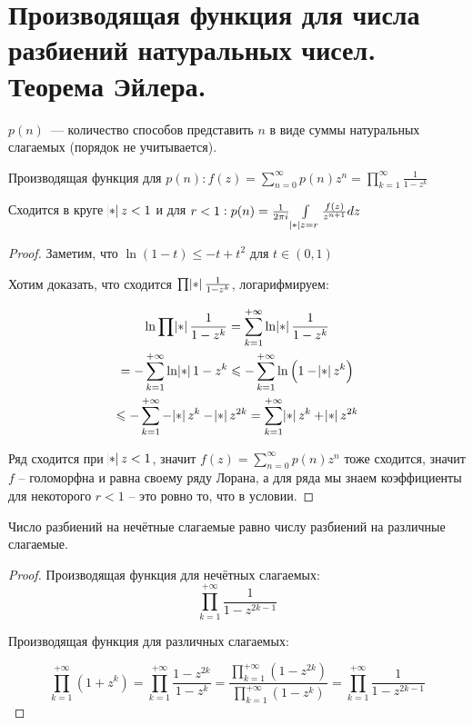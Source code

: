 \section{Производящая функция для числа разбиений натуральных чисел. Теорема Эйлера.}

\begin{definition}
    $p(n)$~--- количество способов представить
    $n$ в виде суммы натуральных слагаемых (порядок не учитывается). 
\end{definition}

\begin{theorem}
    Производящая функция для $p(n): f(z) = \sum\limits_{n=0}^{\infty} p(n) z^n = \prod\limits_{k=1}^{\infty} \frac{1}{1-z^k}$

    Сходится в круге
    $\abs z < 1$ и для $r < 1: p(n) = \frac{1}{2\pi i} \int\limits_{\abs z = r}\frac{f(z)}{z^{n+1}}dz$
\end{theorem}

\begin{proof}
    Заметим, что $\ln(1 - t) \leqslant -t + t^2$ для $t \in (0, 1)$

    Хотим доказать, что сходится $\prod \abs{\frac{1}{1-z^k}}$,
    логарифмируем:

    \begin{gather*}
        \ln \prod \abs{\frac{1}{1-z^k}} =  \sum\limits_{k=1}^{+\infty} \ln \abs{\frac{1}{1-z^k}} \\
        = -\sum\limits_{k=1}^{+\infty} \ln \abs{1-z^k}
        \le -\sum\limits_{k=1}^{+\infty} \ln \left(1-\abs{z}^k\right) \\
        \le -\sum\limits_{k=1}^{+\infty} -\abs{z}^k - \abs{z}^{2k} = \sum\limits_{k=1}^{+\infty} \abs{z}^k + \abs{z}^{2k}
    \end{gather*}

    Ряд сходится при $\abs{z} < 1$, значит $f(z) = \sum\limits_{n=0}^{\infty} p(n) z^n$ тоже сходится, значит $f$ -- голоморфна и равна своему ряду Лорана,
    а для ряда мы знаем коэффициенты для некоторого $r < 1$ -- это ровно то, что в условии.
    
\end{proof}

\begin{theorem}[Эйлер]
    Число разбиений на нечётные слагаемые равно числу разбиений на различные слагаемые.
\end{theorem}

\begin{proof}
    Производящая функция для нечётных слагаемых: 
    \[ \prod\limits_{k=1}^{+\infty} \frac{1}{1-z^{2k-1}} \]

    Производящая функция для различных слагаемых:

    \[
        \prod_{k=1}^{+\infty} (1+z^k)
        = \prod_{k=1}^{+\infty} \frac{1-z^{2k}}{1-z^k}
        =
        \frac{\prod_{k=1}^{+\infty} (1-z^{2k})}
        {\prod_{k=1}^{+\infty} (1-z^{k})}
        =\prod_{k=1}^{+\infty} \frac{1}{1-z^{2k-1}}
    \]
\end{proof}

\newpage
